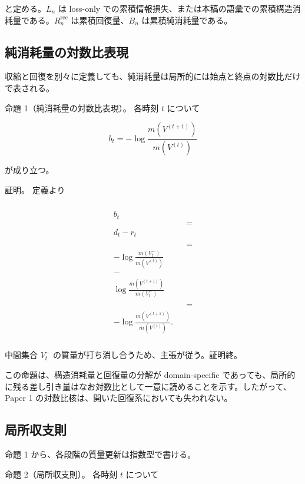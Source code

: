 \documentclass[12pt,a4paper]{article}
\begin{document}
と定める。\(L_{n}\) は loss-only での累積情報損失、または本稿の語彙での累積構造消耗量である。\(R_{n}^{\mathrm{rec}}\) は累積回復量、\(B_{n}\) は累積純消耗量である。

\subsection{純消耗量の対数比表現}\label{ux7d14ux6d88ux8017ux91cfux306eux5bfeux6570ux6bd4ux8868ux73fe}

収縮と回復を別々に定義しても、純消耗量は局所的には始点と終点の対数比だけで表される。

命題 1（純消耗量の対数比表現）。 各時刻 \(t\) について

\[
b_{t} = -\log \frac{m(V^{(t+1)})}{m(V^{(t)})}
\]

が成り立つ。

証明。 定義より

\[
\begin{aligned}
\begin{aligned} \\
b_{t} \\
&&= \\
d_{t} - r_{t} \\ \\
&&= \\
-\log \frac{m(V_{t}^-)}{m(V^{(t)})} \\
- \\
\log \frac{m(V^{(t+1)})}{m(V_{t}^-)} \\ \\
&&= \\
-\log \frac{m(V^{(t+1)})}{m(V^{(t)})}. \\
\end{aligned}
\end{aligned}
\]

中間集合 \(V_{t}^-\) の質量が打ち消し合うため、主張が従う。証明終。

この命題は、構造消耗量と回復量の分解が domain-specific であっても、局所的に残る差し引き量はなお対数比として一意に読めることを示す。したがって、Paper 1 の対数比核は、開いた回復系においても失われない。

\subsection{局所収支則}\label{ux5c40ux6240ux53ceux652fux5247}

命題 1 から、各段階の質量更新は指数型で書ける。

命題 2（局所収支則）。 各時刻 \(t\) について
\end{document}
